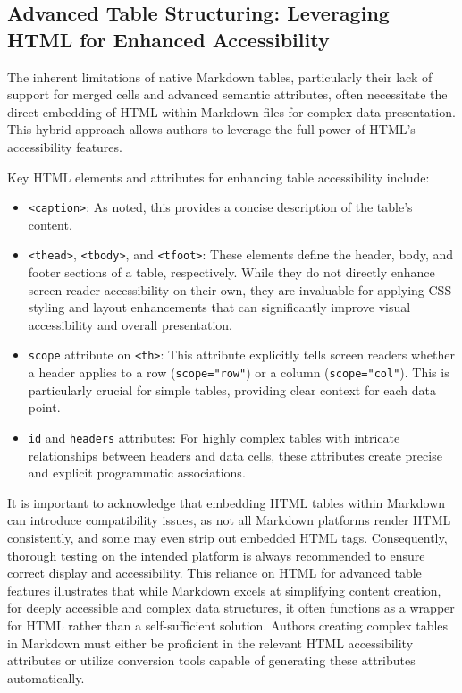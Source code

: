 \subsection{Advanced Table Structuring: Leveraging HTML for Enhanced Accessibility}
The inherent limitations of native Markdown tables, particularly their lack of support for merged cells and advanced semantic attributes, often necessitate the direct embedding of HTML within Markdown files for complex data presentation.\cite{DocsToMarkdown} This hybrid approach allows authors to leverage the full power of HTML's accessibility features.

Key HTML elements and attributes for enhancing table accessibility include:
\begin{itemize}
    \item \texttt{<caption>}: As noted, this provides a concise description of the table's content.\cite{MDNTableAccess}
    \item \texttt{<thead>}, \texttt{<tbody>}, and \texttt{<tfoot>}: These elements define the header, body, and footer sections of a table, respectively.\cite{MDNTableAccess} While they do not directly enhance screen reader accessibility on their own, they are invaluable for applying CSS styling and layout enhancements that can significantly improve visual accessibility and overall presentation.\cite{MDNTableAccess}
    \item \texttt{scope} attribute on \texttt{<th>}: This attribute explicitly tells screen readers whether a header applies to a row (\texttt{scope="row"}) or a column (\texttt{scope="col"}).\cite{MDNTableAccess,OSUDigitalAccess} This is particularly crucial for simple tables, providing clear context for each data point.\cite{MDNTableAccess,OSUDigitalAccess}
    \item \texttt{id} and \texttt{headers} attributes: For highly complex tables with intricate relationships between headers and data cells, these attributes create precise and explicit programmatic associations.\cite{MDNTableAccess}
\end{itemize}
It is important to acknowledge that embedding HTML tables within Markdown can introduce compatibility issues, as not all Markdown platforms render HTML consistently, and some may even strip out embedded HTML tags.\cite{DocsToMarkdown} Consequently, thorough testing on the intended platform is always recommended to ensure correct display and accessibility.\cite{DocsToMarkdown} This reliance on HTML for advanced table features illustrates that while Markdown excels at simplifying content creation, for deeply accessible and complex data structures, it often functions as a wrapper for HTML rather than a self-sufficient solution. Authors creating complex tables in Markdown must either be proficient in the relevant HTML accessibility attributes or utilize conversion tools capable of generating these attributes automatically.

